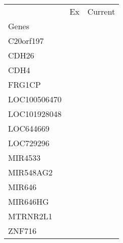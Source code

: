 \begin{tabular}{lcc}
\toprule
{} & Ex & Current \\
Genes        &    &         \\
\midrule
C20orf197    &    &         \\
CDH26        &    &         \\
CDH4         &    &         \\
FRG1CP       &    &         \\
LOC100506470 &    &         \\
LOC101928048 &    &         \\
LOC644669    &    &         \\
LOC729296    &    &         \\
MIR4533      &    &         \\
MIR548AG2    &    &         \\
MIR646       &    &         \\
MIR646HG     &    &         \\
MTRNR2L1     &    &         \\
ZNF716       &    &         \\
\bottomrule
\end{tabular}
